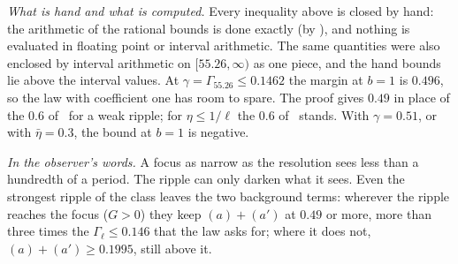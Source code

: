 \emph{What is hand and what is computed.}
Every inequality above is closed by hand: the arithmetic of the rational bounds is done exactly (by ), and nothing is evaluated in floating point or interval arithmetic.
The same quantities were also enclosed by interval arithmetic on $[55.26,\infty)$ as one piece, and the hand bounds lie above the interval values.
At $\gamma=\Gamma_{55.26}\le0.1462$ the margin at $b=1$ is $0.496$, so the law with coefficient one has room to spare.
The proof gives $0.49$ in place of the $0.6$ of~\cite{I} for a weak ripple; for $\eta\le1/\ell$ the $0.6$ of~\cite{I} stands.
With $\gamma=0.51$, or with $\bar\eta=0.3$, the bound at $b=1$ is negative.

\emph{In the observer's words.}
A focus as narrow as the resolution sees less than a hundredth of a period.
The ripple can only darken what it sees.
Even the strongest ripple of the class leaves the two background terms: wherever the ripple reaches the focus ($G>0$) they keep $(a)+(a')$ at $0.49$ or more, more than three times the $\Gamma_\ell\le0.146$ that the law asks for; where it does not, $(a)+(a')\ge0.1995$, still above it.
